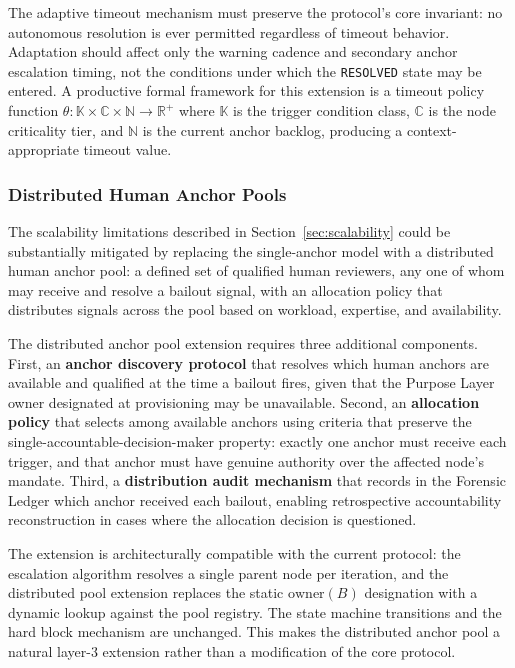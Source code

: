 The adaptive timeout mechanism must preserve the protocol's core invariant: no autonomous resolution is ever permitted regardless of timeout behavior. Adaptation should affect only the warning cadence and secondary anchor escalation timing, not the conditions under which the \texttt{RESOLVED} state may be entered. A productive formal framework for this extension is a timeout policy function $\theta : \mathbb{K} \times \mathbb{C} \times \mathbb{N} \rightarrow \mathbb{R}^+$ where $\mathbb{K}$ is the trigger condition class, $\mathbb{C}$ is the node criticality tier, and $\mathbb{N}$ is the current anchor backlog, producing a context-appropriate timeout value.

\subsubsection{Distributed Human Anchor Pools}\label{sec:anchor-pools}

The scalability limitations described in Section~\ref{sec:scalability} could be substantially mitigated by replacing the single-anchor model with a distributed human anchor pool: a defined set of qualified human reviewers, any one of whom may receive and resolve a bailout signal, with an allocation policy that distributes signals across the pool based on workload, expertise, and availability.

The distributed anchor pool extension requires three additional components. First, an \textbf{anchor discovery protocol} that resolves which human anchors are available and qualified at the time a bailout fires, given that the Purpose Layer owner designated at provisioning may be unavailable. Second, an \textbf{allocation policy} that selects among available anchors using criteria that preserve the single-accountable-decision-maker property: exactly one anchor must receive each trigger, and that anchor must have genuine authority over the affected node's mandate. Third, a \textbf{distribution audit mechanism} that records in the Forensic Ledger which anchor received each bailout, enabling retrospective accountability reconstruction in cases where the allocation decision is questioned.

The extension is architecturally compatible with the current protocol: the escalation algorithm resolves a single parent node per iteration, and the distributed pool extension replaces the static $\text{owner}(B)$ designation with a dynamic lookup against the pool registry. The state machine transitions and the hard block mechanism are unchanged. This makes the distributed anchor pool a natural layer-3 extension rather than a modification of the core protocol.

